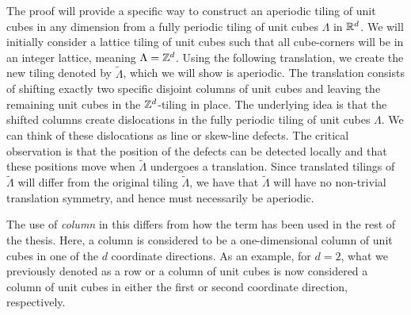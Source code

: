 \documentclass[../thesis.tex]{subfiles}
\begin{document}
The proof will provide a specific way to construct an aperiodic tiling of unit cubes in any dimension from a fully periodic tiling of unit cubes $\Lambda$ in $\mathbb{R}^d$. We will initially consider a lattice tiling of unit cubes such that all cube-corners will be in an integer lattice, meaning $\Lambda = \mathbb{Z}^d$. Using the following translation, we create the new tiling denoted by $\widetilde{\Lambda}$, which we will show is aperiodic. The translation consists of shifting exactly two specific disjoint columns of unit cubes and leaving the remaining unit cubes in the $\mathbb{Z}^d$-tiling in place. The underlying idea is that the shifted columns create dislocations in the fully periodic tiling of unit cubes $\Lambda$. We can think of these dislocations as line or skew-line defects. The critical observation is that the position of the defects can be detected locally and that these positions move when $\widetilde{\Lambda}$ undergoes a translation. Since translated tilings of $\widetilde{\Lambda}$ will differ from the original tiling $\widetilde{\Lambda}$, we have that $\widetilde{\Lambda}$ will have no non-trivial translation symmetry, and hence must necessarily be aperiodic. 

\begin{remark}
    The use of \emph{column} in this  differs from how the term has been used in the rest of the thesis. Here, a column is considered to be a one-dimensional column of unit cubes in one of the $d$ coordinate directions. As an example, for $d=2$, what we previously denoted as a row or a column of unit cubes is now considered a column of unit cubes in either the first or second coordinate direction, respectively.
\end{remark}
\end{document}
